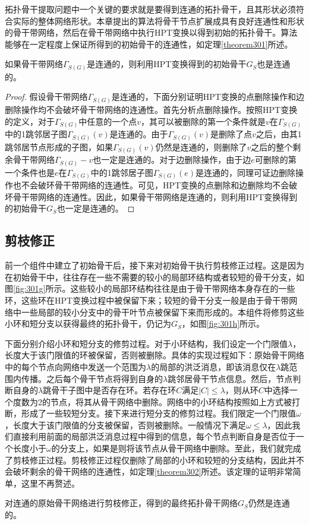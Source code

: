 拓扑骨干提取问题中一个关键的要求就是要得到连通的拓扑骨干，且其形状必须符合实际的整体网络形状。本章提出的算法将骨干节点扩展成具有良好连通性和形状的骨干带网络，然后在骨干带网络中执行HPT变换以得到初始的拓扑骨干。算法能够在一定程度上保证所得到的初始骨干的连通性，如定理\ref{theorem301}所述。
\begin{theorem}
  \label{theorem301}
如果骨干带网络$\Gamma_{S(G)}$是连通的，则利用HPT变换得到的初始骨干$G_S$也是连通的。
\end{theorem}
\begin{proof}
假设骨干带网络$\Gamma_{S(G)}$是连通的，下面分别证明HPT变换的点删除操作和边删除操作均不会破坏骨干带网络的连通性。首先分析点删除操作。按照HPT变换的定义，对于$\Gamma_{S(G)}$中任意的一个点$v$，其可以被删除的第一个条件就是$v$在$\Gamma_{S(G)}$中的1跳邻居子图$\Gamma_{S(G)}(v)$是连通的。由于$\Gamma_{S(G)}(v)$是删除了点$v$之后，由其1跳邻居节点形成的子图，如果$\Gamma_{S(G)}(v)$仍然是连通的，则删除了$v$之后的整个剩余骨干带网络$\Gamma_{S(G)}-v$也一定是连通的。对于边删除操作，由于边$e$可删除的第一个条件也是$e$在$\Gamma_{S(G)}$中的1跳邻居子图$\Gamma_{S(G)}(e)$是连通的，同理可证边删除操作也不会破环骨干带网络的连通性。可见，HPT变换的点删除和边删除均不会破坏骨干带网络的连通性。因此，如果骨干带网络是连通的，则利用HPT变换得到的初始骨干$G_S$也一定是连通的。
\end{proof}
\subsection{剪枝修正}
前一个组件中建立了初始骨干后，接下来对初始骨干执行剪枝修正过程。这是因为在初始骨干中，往往存在一些不需要的较小的局部环结构或者较短的骨干分支，如图\ref{fig:301g}所示。这些较小的局部环结构往往是由于骨干带网络本身存在的一些环，这些环在HPT变换过程中被保留下来；较短的骨干分支一般是由于骨干带网络中一些局部的较小分支中的骨干叶节点被保留下来而形成的。本组件将修剪这些小环和短分支以获得最终的拓扑骨干，仍记为$G_S$，如图\ref{fig:301h}所示。

下面分别介绍小环和短分支的修剪过程。对于小环结构，我们设定一个门限值$\lambda$，长度大于该门限值的环被保留，否则被删除。具体的实现过程如下：原始骨干网络中的每个节点向网络中发送一个范围为$\lambda$的局部的洪泛消息，即该消息仅在$\lambda$跳范围内传播。之后每个骨干节点将得到自身的$\lambda$跳邻居骨干节点信息。然后，节点判断自身的$\lambda$跳骨干子图中是否存在环。若存在环$C$满足$|C|\le\lambda$，则从环$C$中选择一个度数为2的节点，将其从骨干网络中删除。网络中的小环结构按照如上方式被打断，形成了一些较短分支。接下来进行短分支的修剪过程。我们限定一个门限值$\omega$，长度大于该门限值的分支被保留，否则被删除。一般情况下满足$\omega\le\lambda$，因此我们直接利用前面的局部洪泛消息过程中得到的信息，每个节点判断自身是否位于一个长度小于$\omega$的分支上，如果是则将该节点从骨干网络中删除。至此，我们就完成了剪枝修正过程。剪枝修正过程仅删除了局部的小环和较短的分支结构，因此并不会破坏剩余的骨干网络的连通性，如定理\ref{theorem302}所述。该定理的证明非常简单，这里不再赘述。
\begin{theorem}
  \label{theorem302}
对连通的原始骨干网络进行剪枝修正，得到的最终拓扑骨干网络$G_S$仍然是连通的。
\end{theorem}
